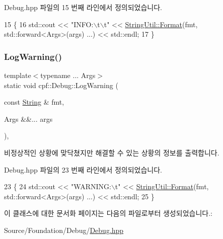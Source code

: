 Debug.\+hpp 파일의 15 번째 라인에서 정의되었습니다.


\begin{DoxyCode}
15                                                               \{
16             std::cout << \textcolor{stringliteral}{"INFO:\(\backslash\)t\(\backslash\)t"}  << \hyperlink{classcpf_1_1_string_util_a965cca44ea396f01f2f3c5e3851f1001}{StringUtil::Format}(fmt, std::forward<Args>(args)
      ...) << std::endl;
17         \}
\end{DoxyCode}
\mbox{\label{classcpf_1_1_debug_a57373c6a7f52d7d41282596e2eb7d901}} 
\subsubsection{\texorpdfstring{Log\+Warning()}{LogWarning()}}
{\footnotesize\ttfamily template$<$typename ... Args$>$ \\
static void cpf\+::\+Debug\+::\+Log\+Warning (\begin{DoxyParamCaption}\item[{const \hyperlink{namespacecpf_a4dbd6992c3ed4440ce7ed8982ff7ffea}{String} \&}]{fmt,  }\item[{Args \&\&...}]{args }\end{DoxyParamCaption})\hspace{0.3cm}{\ttfamily [inline]}, {\ttfamily [static]}}

비정상적인 상황에 맞닥쳤지만 해결할 수 있는 상황의 정보를 출력합니다. 

Debug.\+hpp 파일의 23 번째 라인에서 정의되었습니다.


\begin{DoxyCode}
23                                                                  \{
24             std::cout << \textcolor{stringliteral}{"WARNING:\(\backslash\)t"} << \hyperlink{classcpf_1_1_string_util_a965cca44ea396f01f2f3c5e3851f1001}{StringUtil::Format}(fmt, std::forward<Args>(args)
      ...) << std::endl;
25         \}
\end{DoxyCode}


이 클래스에 대한 문서화 페이지는 다음의 파일로부터 생성되었습니다.\+:\begin{DoxyCompactItemize}
\item 
Source/\+Foundation/\+Debug/\hyperlink{_debug_8hpp}{Debug.\+hpp}\end{DoxyCompactItemize}
